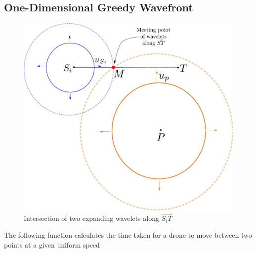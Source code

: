 \documentclass[10.0pt]{report}
\begin{document}
\subsection{One-Dimensional Greedy Wavefront} \hspace{10mm}


\begin{figure}[H]
\centering
\includegraphics[width=14cm]{images/circular_wavelets_intersect_along_st.pdf}
\caption{Intersection of two expanding wavelets along $\vec{S_iT}$}
\end{figure}

The following function calculates the time taken for a drone to move between two points at a given uniform speed
 
\end{document}
